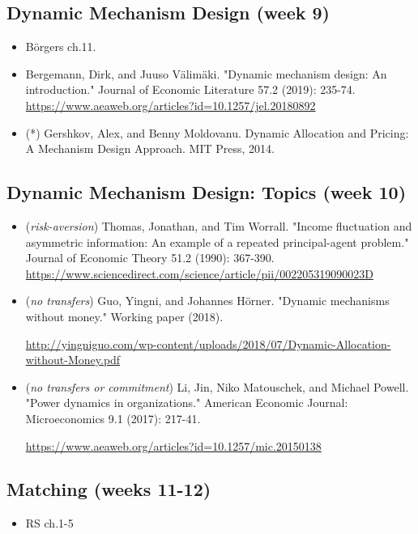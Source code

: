 \documentclass{article}
\begin{document}
\subsection{Dynamic Mechanism Design (week 9)}
\begin{itemize}
	\item B{\"o}rgers ch.11.
	\item Bergemann, Dirk, and Juuso Välimäki. "Dynamic mechanism design: An introduction." Journal of Economic Literature 57.2 (2019): 235-74. \url{https://www.aeaweb.org/articles?id=10.1257/jel.20180892}
	\item (*) Gershkov, Alex, and Benny Moldovanu. Dynamic Allocation and Pricing: A Mechanism Design Approach. MIT Press, 2014. 
\end{itemize}

\subsection{Dynamic Mechanism Design: Topics (week 10)}
\begin{itemize}
	\item (\emph{risk-aversion}) Thomas, Jonathan, and Tim Worrall. "Income fluctuation and asymmetric information: An example of a repeated principal-agent problem." Journal of Economic Theory 51.2 (1990): 367-390. \url{https://www.sciencedirect.com/science/article/pii/002205319090023D}
	\item (\emph{no transfers}) Guo, Yingni, and Johannes Hörner. "Dynamic mechanisms without money." Working paper (2018). 
	
	\url{http://yingniguo.com/wp-content/uploads/2018/07/Dynamic-Allocation-without-Money.pdf}
	\item (\emph{no transfers or commitment}) Li, Jin, Niko Matouschek, and Michael Powell. "Power dynamics in organizations." American Economic Journal: Microeconomics 9.1 (2017): 217-41.
	
	\url{https://www.aeaweb.org/articles?id=10.1257/mic.20150138}
\end{itemize}

\subsection{Matching (weeks 11-12)}
\begin{itemize}
	\item RS ch.1-5
\end{itemize}
\end{document}
